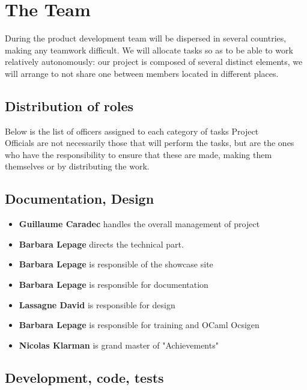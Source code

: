 \documentclass {life-en}
\begin{document}
\newpage

\section{The Team}

During the product development team will be dispersed in several countries, making any teamwork difficult. We will allocate tasks so as to be able to work relatively autonomously: our project is composed of several distinct elements, we will arrange to not share one between members located in different places.\\

\subsection{Distribution of roles}

Below is the list of officers assigned to each category of tasks
Project\\
Officials are not necessarily those that will perform the tasks, but
are the ones who have the responsibility to ensure that these are
made, making them themselves or by distributing the work.

\subsection{Documentation, Design}

\begin{itemize}
  \item \textbf{Guillaume Caradec} handles the overall management of project
  \item \textbf{Barbara Lepage} directs the technical part.
  \item \textbf{Barbara Lepage} is responsible of the showcase site
  \item \textbf{Barbara Lepage} is responsible for documentation
  \item \textbf{Lassagne David} is responsible for design
  \item \textbf{Barbara Lepage} is responsible for training and OCaml Ocsigen
  \item \textbf{Nicolas Klarman} is grand master of "Achievements"
\end{itemize}

\subsection{Development, code, tests}
\end{document}
